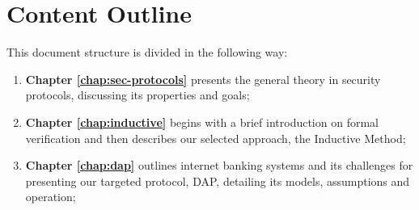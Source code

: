 \section{Content Outline}

This document structure is divided in the following way:

\begin{enumerate}
    \item \textbf{Chapter \ref{chap:sec-protocols}} presents the general theory in security protocols, discussing its properties and goals;

    \item \textbf{Chapter \ref{chap:inductive}} begins with a brief introduction on formal verification and then describes our selected approach, the Inductive Method;

    \item \textbf{Chapter \ref{chap:dap}} outlines internet banking systems and its challenges for presenting our targeted protocol, DAP, detailing its models, assumptions and operation;

\end{enumerate}
